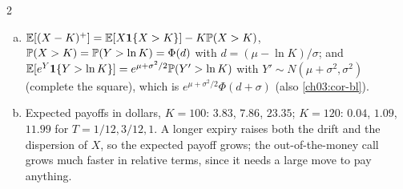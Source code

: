 \begin{paracol}{2}
\begin{solution}[ch03:ex-ps2]
\begin{enumerate}[(a)]
  \item $\mathbb{E}[(X-K)^+]=\mathbb{E}[X\mathbf 1\{X>K\}]-K\mathbb{P}(X>K)$, $\mathbb{P}(X>K)=\mathbb{P}(Y>\ln K)=\Phi(d)$ with $d=(\mu-\ln K)/\sigma$; and
        $\mathbb{E}[e^Y\mathbf 1\{Y>\ln K\}]=e^{\mu+\sigma^2/2}\mathbb{P}(Y'>\ln K)$ with $Y'\sim N(\mu+\sigma^2,\sigma^2)$ (complete the square), which
        is $e^{\mu+\sigma^2/2}\Phi(d+\sigma)$ (also \cref{ch03:cor-bl}).
  \item Expected payoffs in dollars, $K=100$: $3.83$, $7.86$, $23.35$; $K=120$: $0.04$, $1.09$, $11.99$ for $T=1/12,3/12,1$. A longer
        expiry raises both the drift and the dispersion of $X$, so the expected payoff grows; the out-of-the-money call grows
        much faster in relative terms, since it needs a large move to pay anything.
\end{enumerate}
\end{solution}


\end{paracol}
